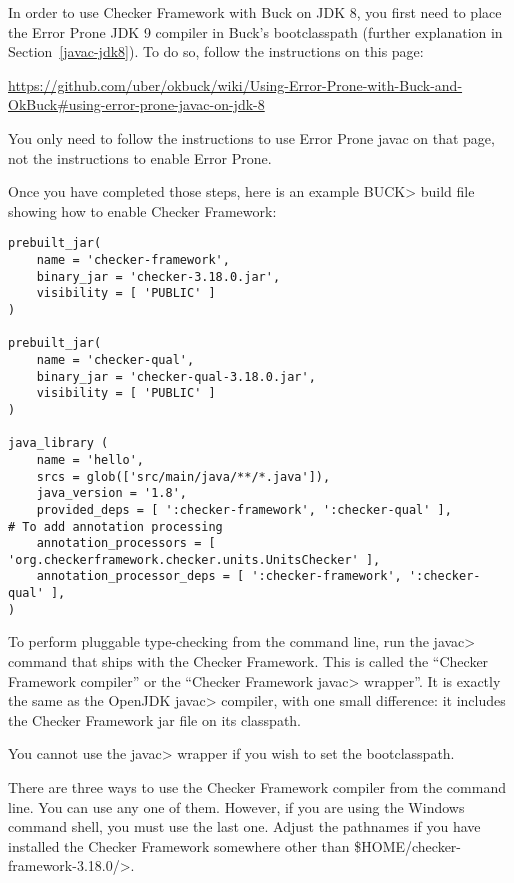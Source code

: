 In order to use Checker Framework with Buck on JDK 8, you first need
to place the Error Prone JDK 9 compiler in Buck's bootclasspath
(further explanation in Section~\ref{javac-jdk8}).  To do so,
follow the instructions on this page:

{\codesize\url{https://github.com/uber/okbuck/wiki/Using-Error-Prone-with-Buck-and-OkBuck#using-error-prone-javac-on-jdk-8}}

You only need to follow the instructions to use Error Prone javac on
that page, not the instructions to enable Error Prone.

Once you have completed those steps, here is an example \<BUCK> build
file showing how to enable Checker Framework:

\begin{Verbatim}
prebuilt_jar(
    name = 'checker-framework',
    binary_jar = 'checker-3.18.0.jar',
    visibility = [ 'PUBLIC' ]
)

prebuilt_jar(
    name = 'checker-qual',
    binary_jar = 'checker-qual-3.18.0.jar',
    visibility = [ 'PUBLIC' ]
)

java_library (
    name = 'hello',
    srcs = glob(['src/main/java/**/*.java']),
    java_version = '1.8',
    provided_deps = [ ':checker-framework', ':checker-qual' ],
# To add annotation processing
    annotation_processors = [ 'org.checkerframework.checker.units.UnitsChecker' ],
    annotation_processor_deps = [ ':checker-framework', ':checker-qual' ],
)
\end{Verbatim}



\label{javac-installation}      %

To perform pluggable type-checking from the command line, run the \<javac>
command that ships with the Checker Framework.  This is called the
``Checker Framework compiler'' or the ``Checker Framework \<javac> wrapper''.
It is exactly the same as the OpenJDK
\<javac> compiler, with one small difference:  it includes the Checker
Framework jar file on its classpath.

You cannot use the \<javac> wrapper if you wish to set the bootclasspath.

There are three ways to use the Checker Framework compiler from the command
line.  You can use any
one of them.  However, if you are using the Windows command shell, you must
use the last one.
Adjust the pathnames if you have installed the Checker Framework somewhere
other than \<\${HOME}/checker-framework-3.18.0/>.


